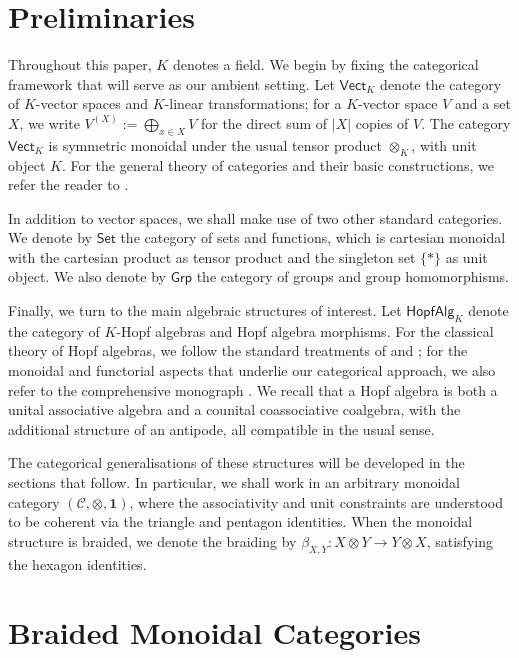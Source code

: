 \documentclass{amsart}
\newcommand{\Set}{\mathsf{Set}}
\newcommand{\Vect}{\mathsf{Vect}}
\newcommand{\Grp}{\mathsf{Grp}}
\newcommand{\HopfAlg}{\mathsf{HopfAlg}}
\newcommand{\VectK}{\Vect_K}
\begin{document}
\section{Preliminaries}\label{sec:preliminaries}

Throughout this paper, $K$ denotes a field. We begin by fixing the categorical framework that will serve as our ambient setting. Let $\VectK$ denote the category of $K$-vector spaces and $K$-linear transformations; for a $K$-vector space $V$ and a set $X$, we write $V^{(X)} := \bigoplus_{x\in X} V$ for the direct sum of $|X|$ copies of $V$. The category $\VectK$ is symmetric monoidal under the usual tensor product $\otimes_K$, with unit object $K$. For the general theory of categories and their basic constructions, we refer the reader to \cite{borceux1994handbook}.

In addition to vector spaces, we shall make use of two other standard categories. We denote by $\Set$ the category of sets and functions, which is cartesian monoidal with the cartesian product as tensor product and the singleton set $\{ * \}$ as unit object. We also denote by $\Grp$ the category of groups and group homomorphisms.

Finally, we turn to the main algebraic structures of interest. Let $\HopfAlg_K$ denote the category of $K$-Hopf algebras and Hopf algebra morphisms. For the classical theory of Hopf algebras, we follow the standard treatments of \cite{Sweedler} and \cite{Abe}; for the monoidal and functorial aspects that underlie our categorical approach, we also refer to the comprehensive monograph \cite{MF}. We recall that a Hopf algebra is both a unital associative algebra and a counital coassociative coalgebra, with the additional structure of an antipode, all compatible in the usual sense.

The categorical generalisations of these structures will be developed in the sections that follow. In particular, we shall work in an arbitrary monoidal category $(\mathcal{C}, \otimes, \mathbf{1})$, where the associativity and unit constraints are understood to be coherent via the triangle and pentagon identities. When the monoidal structure is braided, we denote the braiding by $\beta_{X,Y} \colon X \otimes Y \to Y \otimes X$, satisfying the hexagon identities.
\section{Braided Monoidal Categories}\label{sec:braided}
\end{document}
